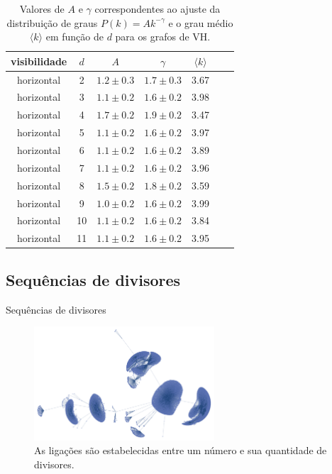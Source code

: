 \documentclass[12pt,
aspectratio=169,
]{beamer}
\begin{document}
\begin{nobarframe}

\begin{table}[H]
\begin{center}
\caption{Valores de $A$ e $\gamma$ correspondentes ao ajuste da distribuição de graus
$P(k)=A k^{-\gamma}$ e o grau médio $\langle k \rangle $ em função de $d$
para os grafos de VH.}
\begin{tabular}{|c|c|c|c|c|c|c|}\hline
        visibilidade & $d$ & $A$ & $\gamma$  & $\langle k \rangle $ \\
        \hline
horizontal & 2 & $1.2 \pm 0.3$  & $1.7 \pm 0.3$ & 3.67 \\
horizontal & 3 & $1.1 \pm 0.2$  & $1.6 \pm 0.2$ & 3.98 \\
horizontal & 4 & $1.7 \pm 0.2$  & $1.9 \pm 0.2$ & 3.47 \\
horizontal & 5 & $1.1 \pm 0.2$  & $1.6 \pm 0.2$ & 3.97 \\
horizontal & 6 & $1.1 \pm 0.2$  & $1.6 \pm 0.2$ & 3.89 \\
horizontal & 7 & $1.1 \pm 0.2$  & $1.6 \pm 0.2$ & 3.96 \\
horizontal & 8 & $1.5 \pm 0.2$  & $1.8 \pm 0.2$ & 3.59 \\
horizontal & 9 & $1.0 \pm 0.2$  & $1.6 \pm 0.2$ & 3.99 \\
horizontal & 10 & $1.1 \pm 0.2$ & $1.6 \pm 0.2$ & 3.84 \\
horizontal & 11 & $1.1 \pm 0.2$ & $1.6 \pm 0.2$ & 3.95 \\
        \hline
    \end{tabular}
    \label{tab:horizontal-stats}
\end{center}
\end{table}
\end{nobarframe}


\subsection{Sequ\^encias de divisores}
\begin{frame}{Sequ\^encias de divisores}

\begin{figure}[H]
    \centering
    \includegraphics[width=0.6\textwidth]{images/divisors.pdf}
    \caption{As ligações são estabelecidas entre um número
    e sua quantidade de divisores.}
    \label{graph-divs}
\end{figure}
\end{frame}
\end{document}
